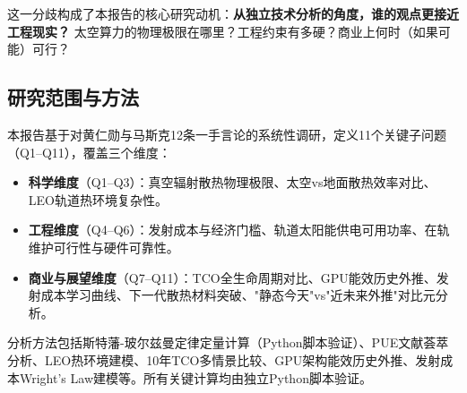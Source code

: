 这一分歧构成了本报告的核心研究动机：\textbf{从独立技术分析的角度，谁的观点更接近工程现实？} 太空算力的物理极限在哪里？工程约束有多硬？商业上何时（如果可能）可行？

\subsection{研究范围与方法}

本报告基于对黄仁勋与马斯克12条一手言论的系统性调研\cite{musk2024kardashev,musk2025starship,musk2025us_saudi,musk2025lunar,musk2026terafab,spacex2026ai1,spacex2026fcc,spacex2026s1,huang2025saudi,huang2026earnings,huang2026gtc,huang2026allin,huang2026lex}，定义11个关键子问题（Q1--Q11），覆盖三个维度：

\begin{itemize}[leftmargin=*]
    \item \textbf{科学维度}（Q1--Q3）：真空辐射散热物理极限、太空vs地面散热效率对比、LEO轨道热环境复杂性。
    \item \textbf{工程维度}（Q4--Q6）：发射成本与经济门槛、轨道太阳能供电可用功率、在轨维护可行性与硬件可靠性。
    \item \textbf{商业与展望维度}（Q7--Q11）：TCO全生命周期对比、GPU能效历史外推、发射成本学习曲线、下一代散热材料突破、"静态今天"vs"近未来外推"对比元分析。
\end{itemize}

分析方法包括斯特藩-玻尔兹曼定律定量计算（Python脚本验证）、PUE文献荟萃分析、LEO热环境建模、10年TCO多情景比较、GPU架构能效历史外推、发射成本Wright's Law建模等。所有关键计算均由独立Python脚本验证\cite{note_sb_script,note_tco_script,note_launch_script}。

